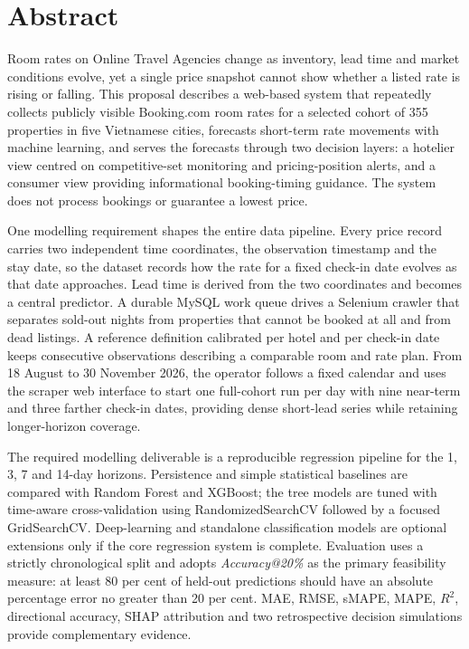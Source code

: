 \chapter*{Abstract}

Room rates on Online Travel Agencies change as inventory, lead time and market conditions evolve, yet a single price snapshot cannot show whether a listed rate is rising or falling. This proposal describes a web-based system that repeatedly collects publicly visible Booking.com room rates for a selected cohort of 355 properties in five Vietnamese cities, forecasts short-term rate movements with machine learning, and serves the forecasts through two decision layers: a hotelier view centred on competitive-set monitoring and pricing-position alerts, and a consumer view providing informational booking-timing guidance. The system does not process bookings or guarantee a lowest price.

One modelling requirement shapes the entire data pipeline. Every price record carries two independent time coordinates, the observation timestamp and the stay date, so the dataset records how the rate for a fixed check-in date evolves as that date approaches. Lead time is derived from the two coordinates and becomes a central predictor. A durable MySQL work queue drives a Selenium crawler that separates sold-out nights from properties that cannot be booked at all and from dead listings. A reference definition calibrated per hotel and per check-in date keeps consecutive observations describing a comparable room and rate plan. From 18 August to 30 November 2026, the operator follows a fixed calendar and uses the scraper web interface to start one full-cohort run per day with nine near-term and three farther check-in dates, providing dense short-lead series while retaining longer-horizon coverage.

The required modelling deliverable is a reproducible regression pipeline for the 1, 3, 7 and 14-day horizons. Persistence and simple statistical baselines are compared with Random Forest and XGBoost; the tree models are tuned with time-aware cross-validation using RandomizedSearchCV followed by a focused GridSearchCV. Deep-learning and standalone classification models are optional extensions only if the core regression system is complete. Evaluation uses a strictly chronological split and adopts \emph{Accuracy@20\%} as the primary feasibility measure: at least 80 per cent of held-out predictions should have an absolute percentage error no greater than 20 per cent. MAE, RMSE, sMAPE, MAPE, $R^2$, directional accuracy, SHAP attribution and two retrospective decision simulations provide complementary evidence.

\clearpage
